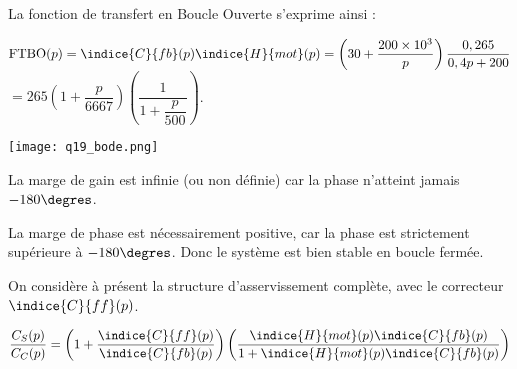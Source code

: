 \ifprof
\begin{corrige}
La fonction de transfert en Boucle Ouverte s’exprime ainsi :

$\text{FTBO}(p)=\indice{C}{fb} (p) \indice{H}{mot} (p)=\left(30+\dfrac{200\times 10^3}{p}\right)\dfrac{0,265}{0,4p+200}$ 
$=265\left(1+\dfrac{p}{6667}\right) \left(\dfrac{1}{1+\dfrac{p}{500}}\right)$.

\begin{center}
\texttt{[image: q19\_bode.png]}
\end{center}

La marge de gain est infinie (ou non définie) car la phase n’atteint jamais $-180\degres$.

La marge de phase est nécessairement positive, car la phase est strictement supérieure à $-180\degres$. Donc le système est bien stable en boucle fermée.
 


\end{corrige}
\else
\fi


On considère à présent la structure d'asservissement complète, avec le correcteur $\indice{C}{ff} (p)$.

\ifprof
\begin{corrige}
$$
\dfrac{C_S (p)}{C_C (p)}= \left(1+\dfrac{\indice{C}{ff} (p)}{\indice{C}{fb} (p)}\right) \left(\dfrac{\indice{H}{mot}(p) \indice{C}{fb} (p)}{1+\indice{H}{mot} (p)\indice{C}{fb} (p) }\right)
$$
\end{corrige}
\else
\fi

